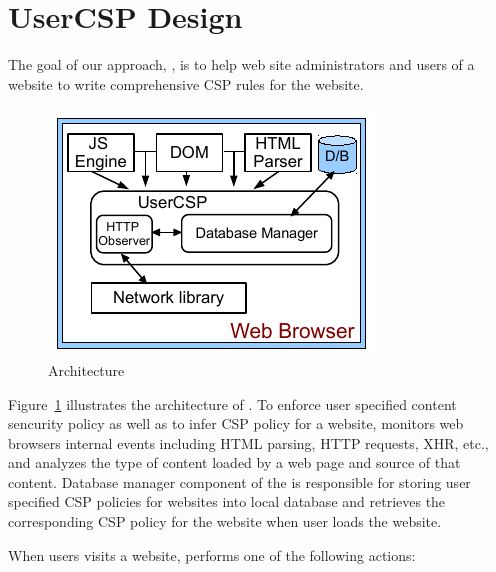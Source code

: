\section{UserCSP Design}
\label{sec:design}

The goal of our approach, \codename, is to help web site
administrators and users of a website to write comprehensive CSP rules
for the website.

\begin{figure}[h!]
\center
  \includegraphics{userCSP_Arch}
\caption{\codename Architecture}
\label{fig:userCSP-Arch}
\end{figure}

Figure~\ref{fig:userCSP-Arch} illustrates the architecture of
\codename. To enforce user specified content sencurity policy as well
as to infer CSP policy for a website, \Codename monitors web browsers
internal events including HTML parsing, HTTP requests, XHR, etc., and
analyzes the type of content loaded by a web page and source of that
content. Database manager component of the \codename is responsible
for storing user specified CSP policies for websites into local
database and retrieves the corresponding CSP policy for the website
when user loads the website.

When users visits a website, \Codename performs one of the following
actions:

